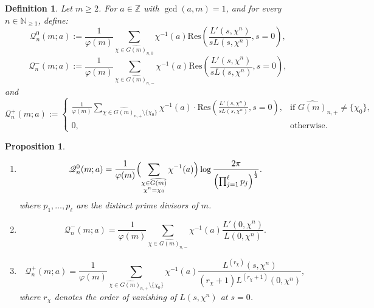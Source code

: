 \documentclass[12pt]{amsart}
\newtheorem{proposition}[theorem]{Proposition}
\newtheorem{definition}[theorem]{Definition}%
\newcommand{\vf}{\varphi}
\begin{document}
\begin{definition}
Let $m \geq 2$. For $a \in \mathbb{Z}$ with $\gcd(a,m) = 1$, and for every $n \in \mathbb{N}_{\geq 1}$, define:
\[
\mathscr{Q}_n^0(m;a) := \frac{1}{\varphi(m)} \sum_{\chi \in \widehat{G(m)}_{n,0}} \chi^{-1}(a)  \mathrm{Res}\left( \frac{L'(s,\chi^n)}{s L(s,\chi^n)}, s=0 \right),
\]
\[
\mathscr{Q}_n^-(m;a) := \frac{1}{\varphi(m)} \sum_{\chi \in \widehat{G(m)}_{n,-}} \chi^{-1}(a) \mathrm{Res}\left( \frac{L'(s,\chi^n)}{s L(s,\chi^n)}, s=0 \right),
\]
and
\[
\mathscr{Q}_n^+(m;a) := 
\begin{cases}
\displaystyle
\frac{1}{\varphi(m)} \sum_{\chi \in \widehat{G(m)}_{n,+} \setminus \{\chi_0\}} \chi^{-1}(a) \cdot \mathrm{Res}\left( \frac{L'(s,\chi^n)}{s L(s,\chi^n)}, s=0 \right), & \text{if } \widehat{G(m)}_{n,+} \neq \{\chi_0\}, \\
0, & \text{otherwise}.
\end{cases}
\]
\end{definition}

 


  

\begin{proposition}

\item 

\begin{enumerate}[label=\roman*)]

\item 
\[
\mathscr{Q}_n^0(m;a)=
\frac{1}{\vf(m)}\Bigl(\sum_{\substack{\chi\in {\widehat{G(m)}} \\
\chi^n=\chi_0}}  \chi^{-1}(a) \Bigr) \log \frac{2\pi}{\left(\prod_{j=1}^{\ell}p_j \right)^{\frac{1}{2}}}.
\]
where $p_1,\ldots,p_\ell$ are the distinct prime divisors of $m$.
\item 
\[
\mathscr{Q}_n^-(m;a)=\frac{1}{\vf(m)}\sum_{\chi\in \widehat{G(m)}_{n,-}} \chi^{-1}(a)   \frac{L'(0,\chi^n)}{L(0,\chi^n)}.
\]


\item 
\[
\mathscr{Q}_n^+(m;a)=
\frac{1}{\varphi(m)} \sum_{\chi \in \widehat{G(m)}_{n,+} \setminus \{\chi_0\}} \chi^{-1}(a) \frac{L^{(r_\chi)}(s,\chi^n)}{ (r_\chi+1)L^{(r_\chi+1)}(0,\chi^n)}, 
\]
where $r_\chi$ denotes the order of vanishing of $L(s, \chi^n)$ at $s = 0$.





\end{enumerate}
\end{proposition}
\end{document}
